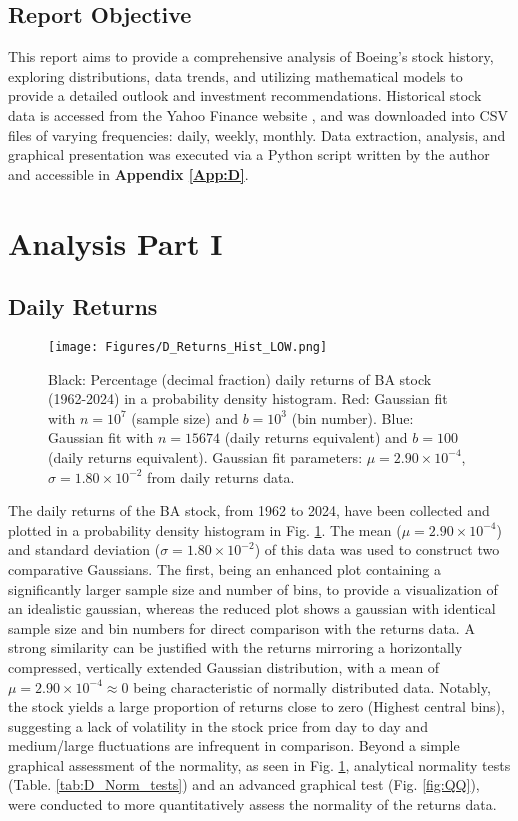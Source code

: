 \documentclass[
	a4paper, %
	11pt, %
	twoside, %
]{LTJournalArticle}
\begin{document}
\subsection{Report Objective}
This report aims to provide a comprehensive analysis of Boeing's stock history, exploring distributions, data trends, and utilizing mathematical models to provide a detailed outlook and investment recommendations.
Historical stock data is accessed from the Yahoo Finance website \cite{yahoo}, and was downloaded into CSV files of varying frequencies: daily, weekly, monthly.
Data extraction, analysis, and graphical presentation was executed via a Python script written by the author and accessible in \textbf{Appendix \ref*{App:D}}.

\section{Analysis Part I}
\label{sec:one}
\subsection{Daily Returns}
\begin{figure}[ht]
	\texttt{[image: Figures/D\_Returns\_Hist\_LOW.png]}
	\caption{Black: Percentage (decimal fraction) daily returns of BA stock (1962-2024) in a probability density histogram. Red: Gaussian fit with $n = 10^{7}$ (sample size) and $b=10^{3}$ (bin number). Blue: Gaussian fit with $n = 15674$ (daily returns equivalent) and $b=100$ (daily returns equivalent). Gaussian fit parameters: $\mu=2.90\times10^{-4}$, $\sigma=1.80\times10^{-2}$ from daily returns data.}
	\label{fig:D_returns}
\end{figure}

\noindent The daily returns of the BA stock, from 1962 to 2024, have been collected and plotted in a probability density histogram in Fig. \ref{fig:D_returns}. 
The mean ($\mu=2.90\times10^{-4}$) and standard deviation ($\sigma=1.80\times10^{-2}$) of this data was used to construct two comparative Gaussians. 
The first, being an enhanced plot containing a significantly larger sample size and number of bins, to provide a visualization of an idealistic gaussian, whereas the reduced plot shows a gaussian with identical sample size and bin numbers for direct comparison with the returns data.
A strong similarity can be justified with the returns mirroring a horizontally compressed, vertically extended Gaussian distribution, with a mean of $\mu=2.90\times10^{-4}\approx0$ being characteristic of normally distributed data.
Notably, the stock yields a large proportion of returns close to zero (Highest central bins), suggesting a lack of volatility in the stock price from day to day and medium/large fluctuations are infrequent in comparison.
Beyond a simple graphical assessment of the normality, as seen in Fig. \ref{fig:D_returns}, analytical normality tests (Table. \ref{tab:D_Norm_tests}) \cite{Norm_tests} and an advanced graphical test (Fig. \ref{fig:QQ}), were conducted to more quantitatively assess the normality of the returns data.
\end{document}
